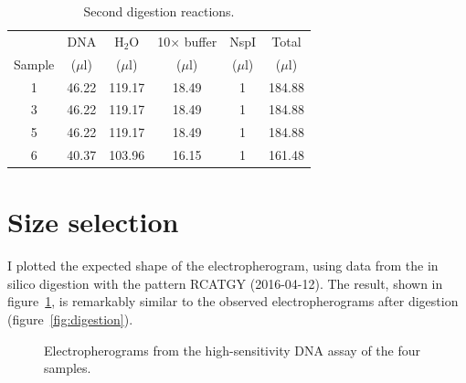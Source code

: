 \documentclass[a4paper,12pt]{article}
\begin{document}
\begin{table}
\begin{center}
\caption{Second digestion reactions.}\label{tau:digestion2}
\vspace*{0.3cm}
\begin{tabular}{cccccc}
\toprule
      &DNA&H$_2$O&10$\times$ buffer&NspI&Total\\
Sample&($\mu$l)&($\mu$l)&($\mu$l)&($\mu$l)&($\mu$l)\\
\midrule
1&46.22&119.17&18.49&1&184.88\\
3&46.22&119.17&18.49&1&184.88\\
5&46.22&119.17&18.49&1&184.88\\
6&40.37&103.96&16.15&1&161.48\\
\bottomrule
\end{tabular}
\end{center}
\end{table}

\section{Size selection}
I plotted the expected shape of the electropherogram, using data from the in silico digestion with the pattern RCATGY (2016-04-12). The result, shown in figure~\ref{fig:expected}, is remarkably similar to the observed electropherograms after digestion (figure~\ref{fig:digestion}).

\begin{figure}
\caption{Electropherograms from the high-sensitivity DNA assay of the four samples.}\label{fig:expected}
\end{figure}
\end{document}
